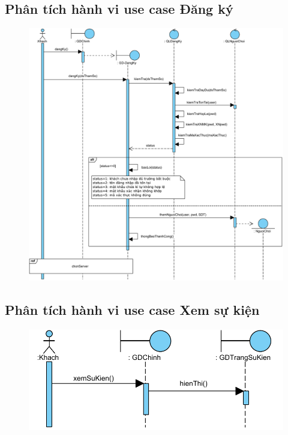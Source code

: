 \documentclass[3p]{elsarticle}
\begin{document}
\subsection{Phân tích hành vi use case Đăng ký}
\begin{figure}[!htbp]
	\hspace*{-.5in}
	\centering
	\includegraphics[scale=.55]{images/sequence-pdfs/guest/Signup.pdf}
\end{figure}
\newpage
\subsection{Phân tích hành vi use case Xem sự kiện}
\begin{figure}[!htbp]
	\hspace*{-.5in}
	\centering
	\includegraphics[scale=.55]{images/sequence-pdfs/guest/viewEvents.pdf}
\end{figure}
\newpage
\end{document}
